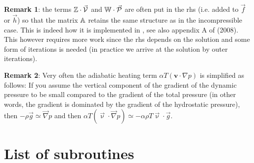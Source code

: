 \documentclass[a4paper,12pt]{article}
\begin{document}
 
{\bf Remark 1}: the terms ${\mathbb{Z}}\cdot \vec{\cal V}$ and ${\mathbb{W}}\cdot \vec{\cal P}$ are 
often put in the rhs (i.e. added to $\vec{f}$ or $\vec{h}$) so that 
the matrix ${\mathbb{A}}$ retains the same structure as in the incompressible case. This is indeed 
how it is implemented in \aspect, see also appendix A of \textcite{lezh08} (2008). 
This however requires more work since the rhs depends 
on the solution and some form of iterations is needed (in practice we arrive at the 
solution by outer iterations). 

{\bf Remark 2}: Very often the adiabatic heating term  
$\alpha T \left( \bm v \cdot \nabla p \right)$ is simplified as follows:
If you assume the vertical component of the gradient of the dynamic pressure to be small compared to the
gradient of the total pressure (in other words, the gradient is dominated by the gradient of the hydrostatic
pressure), then $-\rho {\vec g} \simeq {\vec \nabla}p$ and then 
$\alpha T \left( \vec\upnu \cdot \vec\nabla p \right) \simeq  
-\alpha\rho T {\vec\upnu}\cdot{\vec g}$. 

















\section{List of subroutines}














 \label{chapt:elefant} %

\printbibliography
\end{document}
